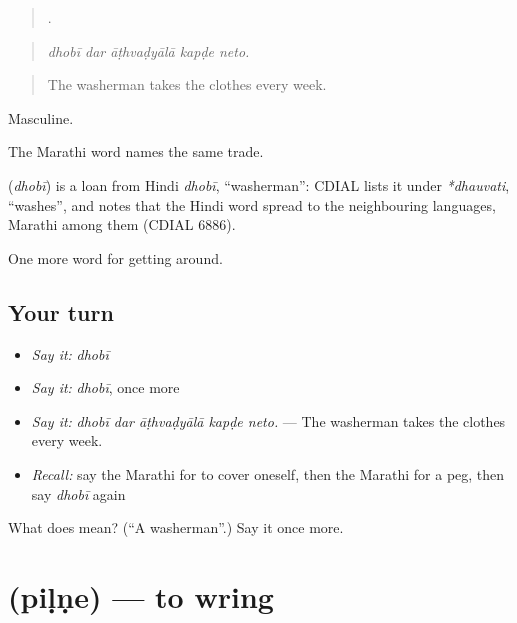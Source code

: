\begin{quote}
    .
\end{quote}

\begin{quote}
\emph{dhobī dar āṭhvaḍyālā kapḍe neto.}
\end{quote}

\begin{quote}
The washerman takes the clothes every week.
\end{quote}

Masculine.

The Marathi word  names the same trade.

\begin{cousinweb}
\textbf{} (\emph{dhobī}) is a loan from Hindi \emph{dhobī}, \textquotedblleft{}washerman\textquotedblright{}: CDIAL lists it under \emph{*dhauvati}, \textquotedblleft{}washes\textquotedblright{}, and notes that the Hindi word spread to the neighbouring languages, Marathi among them (CDIAL 6886).
\end{cousinweb}

\begin{grammarlens}[title={What you've built}]
One more word for getting around.
\end{grammarlens}

\subsection*{Your turn}
\begin{itemize}
\raggedright
  \item \emph{Say it:} \emph{dhobī}
  \item \emph{Say it:} \emph{dhobī}, once more
  \item \emph{Say it:} \emph{dhobī dar āṭhvaḍyālā kapḍe neto.} — The washerman takes the clothes every week.
  \item \emph{Recall:} say the Marathi for to cover oneself, then the Marathi for a peg, then say \emph{dhobī} again
\end{itemize}

\begin{tcolorbox}[breakable,colback=teal!4,colframe=teal!35!black,title={Before you move on}]
What does  mean? (\textquotedblleft{}A washerman\textquotedblright{}.) Say it once more.
\end{tcolorbox}
\section[\texorpdfstring{\mr{पिळणे} (piḷṇe)}{पिळणे (piḷṇe)}]{ (piḷṇe) — to wring}

